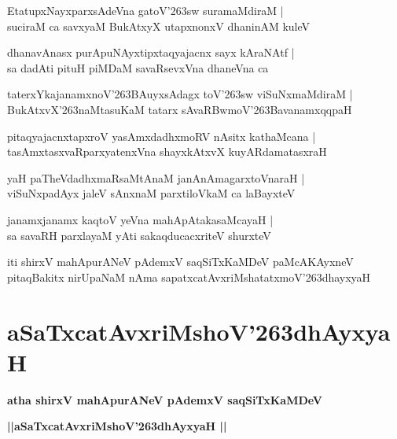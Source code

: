 \documentclass[twoside,12pt,openright]{book}
\def\S{\char'263}
\newcounter{shloka}[chapter]
\begin{document}
\begin{shloka}%
EtatupxNayxparxsAdeVna gatoV\S sw suramaMdiraM |\\
suciraM ca savxyaM BukAtxyX utapxnonxV dhaninAM kuleV 
\end{shloka}

\begin{shloka}%
dhanavAnasx purApuNAyxtipxtaqyajacnx sayx kAraNAtf |\\
sa dadAti pituH piMDaM savaRsevxVna dhaneVna ca 
\end{shloka}

\begin{shloka}%
taterxYkajanamxnoV\S BAuyxsAdagx toV\S sw viSuNxmaMdiraM |\\
BukAtxvX\S naMtasuKaM tatarx sAvaRBwmoV\S BavanamxqqpaH 
\end{shloka}

\begin{shloka}%
pitaqyajacnxtapxroV yasAmxdadhxmoRV nAsitx kathaMcana |\\
tasAmxtasxvaRparxyatenxVna shayxkAtxvX kuyARdamatasxraH 
\end{shloka}

\begin{shloka}%
yaH paTheVdadhxmaRsaMtAnaM janAnAmagarxtoVnaraH |\\
viSuNxpadAyx jaleV sAnxnaM parxtiloVkaM ca laBayxteV 
\end{shloka}

\begin{shloka}%
janamxjanamx kaqtoV yeVna mahApAtakasaMcayaH |\\
sa savaRH parxlayaM yAti sakaqducacxriteV shurxteV 
\end{shloka}

\begin{center}
iti shirxV mahApurANeV pAdemxV saqSiTxKaMDeV paMcAKAyxneV pitaqBakitx nirUpaNaM nAma 
sapatxcatAvxriMshatatxmoV\S dhayxyaH
\end{center}

\chapter{aSaTxcatAvxriMshoV\S dhAyxyaH}

\begin{center}
{\LARGE\bfseries atha shirxV mahApurANeV pAdemxV saqSiTxKaMDeV}
\end{center}

\begin{center}
{\LARGE\bfseries ||aSaTxcatAvxriMshoV\S dhAyxyaH || }
\end{center}
\end{document}
